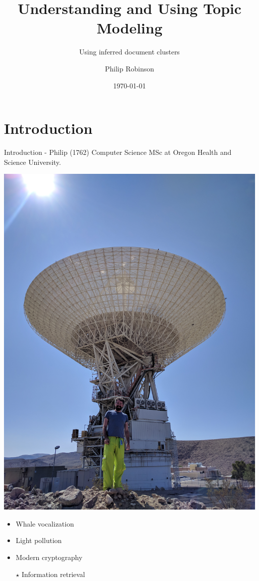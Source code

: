 \documentclass[10pt]{beamer}
\title{Understanding and Using Topic Modeling}
\subtitle{Using inferred document clusters}
\author{Philip Robinson}
\date{\today}
\institute{Presented to OpsLab \\ NASA - Jet Propulsion Lab}
\begin{document}
\begin{frame}
  \titlepage

\end{frame}

\section{Introduction}
\begin{frame}{Introduction - Philip (1762)}
  Computer Science MSc at Oregon Health and Science University.

  \vspace{1em}

  \begin{multicols}{2}
    \includegraphics[width=\columnwidth]{./philip.jpg}


  \begin{itemize}
  \item Whale vocalization
  \item Light pollution
  \item Modern cryptography
  \item[$\star$] Information retrieval
  \end{itemize}

  \end{multicols}

\end{frame}
\end{document}
